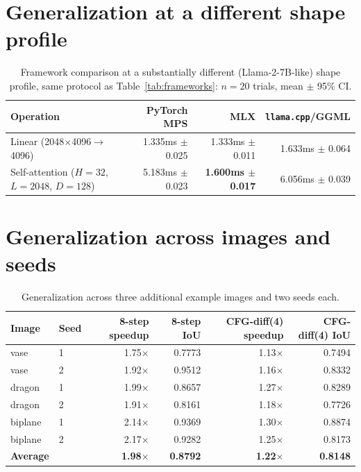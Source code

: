 \documentclass{article}
\newcommand{\code}[1]{\texttt{#1}}
\begin{document}
\section{Generalization at a different shape profile}
\label{app:generalization-shape}
\begin{table}[h]
    \centering
    \caption{Framework comparison at a substantially different (Llama-2-7B-like) shape profile,
    same protocol as Table~\ref{tab:frameworks}: $n{=}20$ trials, mean $\pm$ 95\% CI.}
    \begin{tabular}{@{}lrrr@{}}
        \toprule
        Operation & PyTorch MPS & MLX & \code{llama.cpp}/GGML \\
        \midrule
        Linear (2048$\times$4096$\to$4096) & 1.335ms $\pm$ 0.025 & 1.333ms $\pm$ 0.011 & 1.633ms $\pm$ 0.064 \\
        Self-attention ($H{=}32$, $L{=}2048$, $D{=}128$) & 5.183ms $\pm$ 0.023 & \textbf{1.600ms $\pm$ 0.017} & 6.056ms $\pm$ 0.039 \\
        \bottomrule
    \end{tabular}
\end{table}

\section{Generalization across images and seeds}
\label{app:generalization-images}
\begin{table}[h]
    \centering
    \caption{Generalization across three additional example images and two seeds each.}
    \begin{tabular}{@{}llrrrr@{}}
        \toprule
        Image & Seed & 8-step speedup & 8-step IoU & CFG-diff(4) speedup & CFG-diff(4) IoU \\
        \midrule
        vase & 1 & 1.75$\times$ & 0.7773 & 1.13$\times$ & 0.7494 \\
        vase & 2 & 1.92$\times$ & 0.9512 & 1.16$\times$ & 0.8332 \\
        dragon & 1 & 1.99$\times$ & 0.8657 & 1.27$\times$ & 0.8289 \\
        dragon & 2 & 1.91$\times$ & 0.8161 & 1.18$\times$ & 0.7726 \\
        biplane & 1 & 2.14$\times$ & 0.9369 & 1.30$\times$ & 0.8874 \\
        biplane & 2 & 2.17$\times$ & 0.9282 & 1.25$\times$ & 0.8173 \\
        \midrule
        \textbf{Average} & & \textbf{1.98$\times$} & \textbf{0.8792} & \textbf{1.22$\times$} & \textbf{0.8148} \\
        \bottomrule
    \end{tabular}
\end{table}
\end{document}
